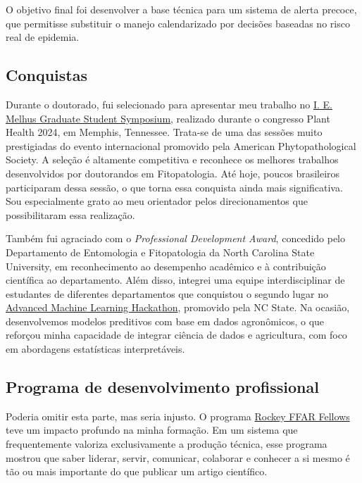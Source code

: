 \documentclass[12pt,a4paper,oneside]{book}
\newcommand{\NCState}{North Carolina State University}
\begin{document}
O objetivo final foi desenvolver a base técnica para um sistema de alerta precoce, que permitisse 
substituir o manejo calendarizado por decisões baseadas no risco real de epidemia.

\subsection{Conquistas}

Durante o doutorado, fui selecionado para apresentar meu trabalho no
\href{https://www.apsnet.org/members/give-awards/foundation/awardees/Pages/2024.aspx}{I. E. Melhus Graduate Student Symposium}, 
realizado durante o congresso Plant Health 2024, em Memphis, Tennessee. Trata-se de uma das sessões muito prestigiadas do 
evento internacional promovido pela American Phytopathological Society. A seleção é altamente competitiva e reconhece os 
melhores trabalhos desenvolvidos por doutorandos em Fitopatologia. Até hoje, poucos brasileiros participaram dessa sessão,
o que torna essa conquista ainda mais significativa. Sou especialmente grato ao meu orientador pelos direcionamentos 
que possibilitaram essa realização.

Também fui agraciado com o \textit{Professional Development Award}, concedido pelo Departamento de Entomologia e 
Fitopatologia da \NCState{}, em reconhecimento ao desempenho acadêmico e à contribuição científica ao 
departamento. Além disso, integrei uma equipe interdisciplinar de estudantes de diferentes departamentos que conquistou o segundo lugar no
\href{https://cals.ncsu.edu/psi/news/third-annual-n-c-psi-hackathon-brings-in-record-numbers/}{Advanced Machine Learning Hackathon}, 
promovido pela NC State. Na ocasião, desenvolvemos modelos preditivos com base em dados agronômicos, o que 
reforçou minha capacidade de integrar ciência de dados e agricultura, com foco em abordagens estatísticas interpretáveis.

\subsection{Programa de desenvolvimento profissional}

Poderia omitir esta parte, mas seria injusto. O programa \href{https://ffarfellows.org/}{Rockey FFAR Fellows} teve um 
impacto profundo na minha formação. Em um sistema que frequentemente valoriza exclusivamente a produção técnica, 
esse programa mostrou que saber liderar, servir, comunicar, colaborar
e conhecer a si mesmo é tão ou mais importante do que publicar um artigo científico.
\end{document}
